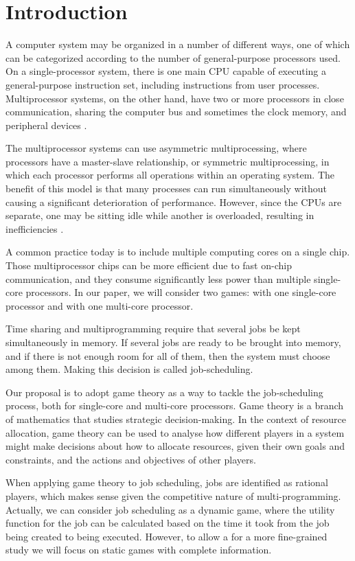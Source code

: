 \section{Introduction}
A computer system may be organized in a number of different ways, 
one of which can be categorized according to the number of 
general-purpose processors used. On a single-processor system, 
there is one main CPU capable of executing a general-purpose instruction 
set, including instructions from user processes.
Multiprocessor systems, on the other hand, have two or more processors 
in close communication, sharing the computer bus and sometimes the clock
memory, and peripheral devices \cite{10.5555/2490781}.

The multiprocessor systems can use asymmetric multiprocessing, 
where processors have a master-slave relationship, 
or symmetric multiprocessing, in which each processor performs all 
operations within an operating system. 
The benefit of this model is that many processes can run simultaneously 
without causing a significant deterioration of performance. 
However, since the CPUs are separate, one may be sitting idle while 
another is overloaded, resulting in inefficiencies \cite{10.1145/1463822.1463838}.

A common practice today is to include multiple computing cores on a 
single chip. 
Those multiprocessor chips can be more efficient due to fast 
on-chip communication, and they consume significantly less power than 
multiple single-core processors. 
In our paper, we will consider two games: with one single-core processor 
and with one multi-core processor. 

Time sharing and multiprogramming require that several jobs be kept simultaneously in memory. 
If several jobs are ready to be brought into memory, and if there is not enough room for all of them,
then the system must choose among them. 
Making this decision is called job-scheduling. 

Our proposal is to adopt game theory as a way to tackle the job-scheduling process, 
both for single-core and multi-core processors. 
Game theory is a branch of mathematics that studies strategic decision-making. 
In the context of resource allocation, game theory can be used to analyse how 
different players in a system might make decisions about how to allocate resources, 
given their own goals and constraints, and the actions and objectives of other players. 

When applying game theory to job scheduling, jobs are identified as rational players, 
which makes sense given the competitive nature of multi-programming. 
Actually, we can consider job scheduling as a dynamic game, where the utility 
function for the job can be calculated based on the time it took from the job being 
created to being executed. However, to allow a for a more fine-grained study we will 
focus on static games with complete information.


